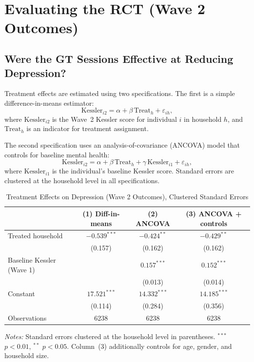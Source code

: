 \documentclass[12pt]{article}
\begin{document}
\section{Evaluating the RCT (Wave 2 Outcomes)}

\subsection{Were the GT Sessions Effective at Reducing Depression?}

Treatment effects are estimated using two specifications. The first is a simple difference-in-means estimator:
\begin{equation}
\text{Kessler}_{i2} = \alpha + \beta \, \text{Treat}_h + \varepsilon_{ih},
\end{equation}
where $\text{Kessler}_{i2}$ is the Wave~2 Kessler score for individual $i$ in household $h$, and $\text{Treat}_h$ is an indicator for treatment assignment.

The second specification uses an analysis-of-covariance (ANCOVA) model that controls for baseline mental health:
\begin{equation}
\text{Kessler}_{i2} = \alpha + \beta \, \text{Treat}_h + \gamma \, \text{Kessler}_{i1} + \varepsilon_{ih},
\end{equation}
where $\text{Kessler}_{i1}$ is the individual's baseline Kessler score. Standard errors are clustered at the household level in all specifications.

\begin{table}[H]
\centering
\caption{Treatment Effects on Depression (Wave 2 Outcomes), Clustered Standard Errors}
\label{tab:treatment}
\begin{tabular}{lccc}
\toprule
 & (1) Diff-in-means & (2) ANCOVA & (3) ANCOVA + controls \\
\midrule
Treated household & $-0.539^{***}$ & $-0.424^{**}$ & $-0.429^{**}$ \\
 & (0.157) & (0.162) & (0.162) \\[4pt]
Baseline Kessler (Wave 1) & & $0.157^{***}$ & $0.152^{***}$ \\
 & & (0.013) & (0.014) \\[4pt]
Constant & $17.521^{***}$ & $14.332^{***}$ & $14.185^{***}$ \\
 & (0.114) & (0.284) & (0.356) \\
\midrule
Observations & 6238 & 6238 & 6238 \\
\bottomrule
\end{tabular}
\begin{flushleft}
\small\textit{Notes:} Standard errors clustered at the household level in parentheses. $^{***}$ $p<0.01$, $^{**}$ $p<0.05$. Column~(3) additionally controls for age, gender, and household size.
\end{flushleft}
\end{table}
\end{document}
